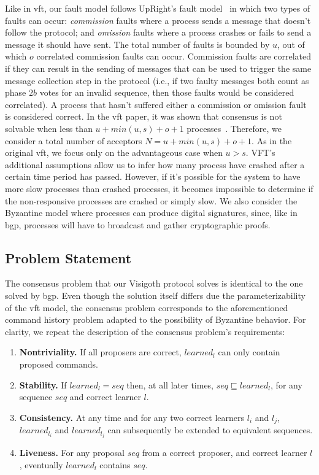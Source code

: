 Like in \acrshort{vft}, our fault model follows UpRight's fault model~\cite{Clement:2009} in which two types of faults can occur: \textit{commission} faults where a process sends a message that doesn't follow the protocol; and \textit{omission} faults where a process crashes or fails to send a message it should have sent. The total number of faults is bounded by $u$, out of which $o$ correlated commission faults can occur. Commission faults are correlated if they can result in the sending of messages that can be used to trigger the same message collection step in the protocol {\color{red}(i.e., if two faulty messages both count as phase $2b$ votes for an invalid sequence, then those faults would be considered correlated)}. A process that hasn't suffered either a commission or omission fault is considered correct. In the \acrshort{vft} paper, it was shown that consensus is not solvable when less than $u+min(u,s)+o+1$ processes~\cite{Porto2015}. Therefore, we consider a total number of acceptors $N = u + min(u,s)+o+1$. As in the original \acrshort{vft}, we focus only on the advantageous case when $u>s$. VFT's additional assumptions allow us to infer how many process have crashed after a certain time period has passed. However, if it's possible for the system to have more slow processes than crashed processes, it becomes impossible to determine if the non-responsive processes are crashed or simply slow.	We also consider the Byzantine model where processes can produce digital signatures, since, like in \acrshort{bgp}, processes will have to broadcast and gather cryptographic proofs.

\subsection{Problem Statement}
The consensus problem that our Visigoth protocol solves is identical to the one solved by \acrshort{bgp}. Even though the solution itself differs due the parameterizability of the \acrshort{vft} model, the consensus problem corresponds to the aforementioned command history problem adapted to the possibility of Byzantine behavior. For clarity, we repeat the description of the consensus problem's requirements:

\begin{enumerate}
	\item \textbf{Nontriviality.} If all proposers are correct, $learned_l$ can only contain proposed commands.
	\item \textbf{Stability.} If $learned_l = seq$ then, at all later times, $seq \sqsubseteq learned_l$, for any sequence $seq$ and correct learner $l$.
	\item \textbf{Consistency.} At any time and for any two correct learners $l_i$ and $l_j$, $learned_{l_i}$ and $learned_{l_j}$ can subsequently be extended to equivalent sequences.
	\item \textbf{Liveness.} For any proposal $seq$ from a correct proposer, and correct learner $l$, eventually $learned_l$ contains $seq$.
\end{enumerate}